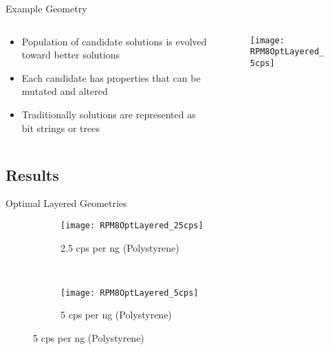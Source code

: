 \begin{frame}{Example Geometry}
\begin{columns}[onlytextwidth]
  \begin{column}{0.45\textwidth}
    \small
    \begin{itemize}
      \item Population of candidate solutions is evolved toward better solutions
      \item Each candidate has properties that can be mutated and altered
      \item Traditionally solutions are represented as bit strings or trees
    \end{itemize}
    \end{column}
  \begin{column}{0.45\textwidth}
    \begin{figure}
      \texttt{[image: RPM8OptLayered\_5cps]}
    \end{figure}
  \end{column}
\end{columns}
\hyperlink{GAMethodExtended}{}
\end{frame}
\subsection{Results}
\begin{frame}{Optimal Layered Geometries}
\begin{figure}
    \centering
    \begin{subfigure}[b]{0.45\textwidth}
        \texttt{[image: RPM8OptLayered\_25cps]}
        \caption{2.5 cps per ng  (Polystyrene)}
    \end{subfigure}%
    ~
    \begin{subfigure}[b]{0.45\textwidth}
        \texttt{[image: RPM8OptLayered\_5cps]}
        \caption{5 cps per ng  (Polystyrene)}
    \end{subfigure}
\end{figure}
\end{frame}
\begin{frame}

\end{frame}

